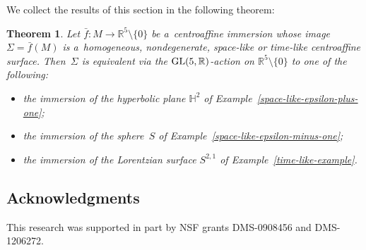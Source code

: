 \documentclass[10pt,a4paper]{amsart}
\numberwithin{equation}{section}
\newtheorem{teo}{Theorem}[section]
\theoremstyle{definition}
\begin{document}
We collect the results of this section in the following theorem:



\begin{teo}
\label{homog-thm}
Let $\bar{f}:M \to \mathbb{R}^5 \setminus\{0\}$ be a~centroaffine immersion whose image $\Sigma = \bar{f}(M)$ is
a~homogeneous, nondegenerate, space-like or time-like centroaffine surface.
Then~$\Sigma$ is equivalent via the ${\rm GL}(5,\mathbb{R})$-action on $\mathbb{R}^5 \setminus \{0 \}$ to one of the
following:
\begin{itemize}\itemsep=0pt
\item the immersion of the hyperbolic plane $\mathbb{H}^2$ of Example~{\rm \ref{space-like-epsilon-plus-one}};
\item the immersion of the sphere~$S$ of Example~{\rm \ref{space-like-epsilon-minus-one}};
\item the immersion of the Lorentzian surface $S^{2,1}$ of Example~{\rm \ref{time-like-example}}.
\end{itemize}
\end{teo}


\subsection*{Acknowledgments}
This research was supported in part by NSF grants DMS-0908456 and DMS-1206272.

\end{document}
